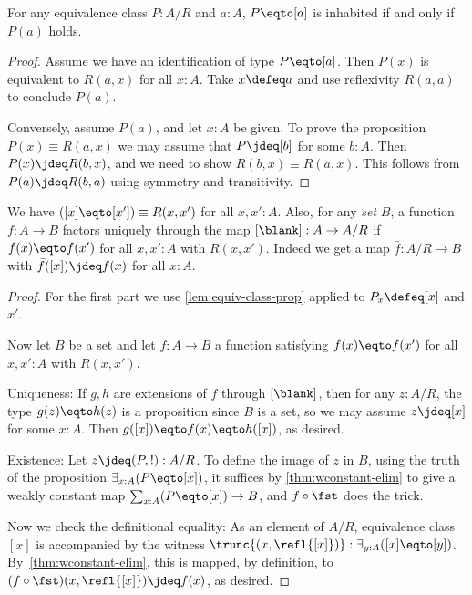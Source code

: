 \begin{lemma}\label{lem:equiv-class-prop}
  For any equivalence class $P : A/R$ and $a:A$,
  $P \eqto [a]$ is inhabited if and only if $P(a)$ holds.
\end{lemma}
\begin{proof}
  Assume we have an identification of type $P \eqto [a]$. Then $P(x)$ is equivalent to $R(a,x)$ for all $x:A$.
  Take $x\defeq a$ and use reflexivity $R(a,a)$ to conclude $P(a)$.

  Conversely, assume $P(a)$, and let $x:A$ be given.
  To prove the proposition $P(x) \equiv R(a,x)$ we may assume that
  $P \jdeq [b]$ for some $b:A$.
  Then $P(x) \jdeq R(b,x)$, and we need to show $R(b,x) \equiv R(a,x)$.
  This follows from $P(a) \jdeq R(b,a)$ using symmetry and transitivity.
\end{proof}
\begin{theorem}\label{thm:quotient-property}
  We have $([x] \eqto [x']) \equiv R(x,x')$ for all $x,x':A$.
  Also, for any \emph{set} $B$, a
  function $f : A \to B$ factors uniquely through the map $[\blank] : A \to A/R$ if
  $f(x) \eqto f(x')$ for all $x,x':A$ with $R(x,x')$.
  Indeed we get a map $\bar f : A/R \to B$ with
  $\bar f([x]) \jdeq f(x)$ for all $x:A$.
\end{theorem}
\begin{proof}
  For the first part we use \cref{lem:equiv-class-prop} applied to $P_x \defeq [x]$ and $x'$.

  Now let $B$ be a set and let $f : A \to B$ a function satisfying $f(x) \eqto f(x')$
  for all $x,x':A$ with $R(x,x')$.

  Uniqueness: If $g,h$ are extensions of $f$ through $[\blank]$, then
  for any $z:A/R$, the type $g(z) \eqto h(z)$ is a proposition since $B$ is
  a set, so we may assume $z\jdeq [x]$ for some $x:A$. Then
  $g([x]) \eqto f(x) \eqto h([x])$, as desired.

  Existence: Let $z\jdeq(P,!):A/R$. To define the image of $z$ in $B$,
  using the truth of the proposition $\exists_{x:A}(P \eqto [x])$,
  it suffices by \cref{thm:wconstant-elim}
  to give a weakly constant map $\sum_{x:A}(P \eqto [x]) \to B$,
  and $f \circ \fst$ does the trick.

  Now we check the definitional equality: As an element of $A/R$,
  equivalence class $[x]$ is accompanied by the witness
  $\trunc{(x, \refl{[x]})} : \exists_{y:A}([x] \eqto [y])$.
  By~\cref{thm:wconstant-elim}, this is mapped, by definition,
  to $(f \circ \fst)(x, \refl{[x]}) \jdeq f(x)$, as desired.
\end{proof}

